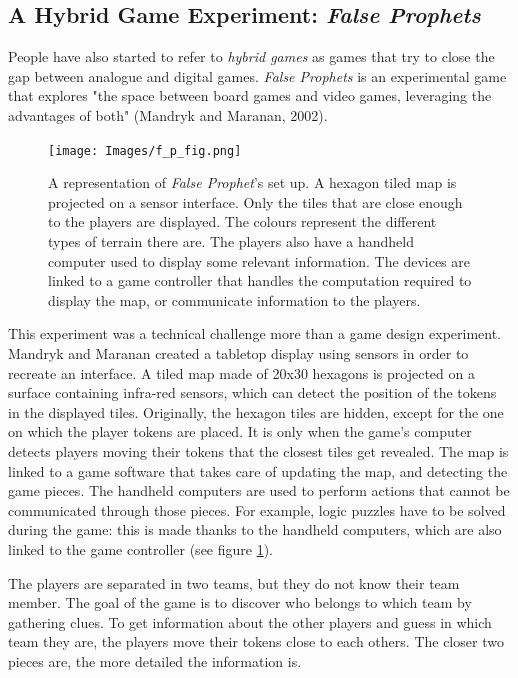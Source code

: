 \subsection{A Hybrid Game Experiment: \textit{False Prophets}}
People have also started to refer to \textit{hybrid games} as games that try to close the gap between analogue and digital games. \textit{False Prophets} is an experimental game that explores "the space between board games and video games, leveraging the advantages of both" (Mandryk and Maranan, 2002)\cite{art:prophets}. 

\begin{figure}[!ht]
    \centering
    \texttt{[image: Images/f\_p\_fig.png]}
    \caption{A representation of \textit{False Prophet}'s set up. A hexagon tiled map is projected on a sensor interface. Only the tiles that are close enough to the players are displayed. The colours represent the different types of terrain there are. The players also have a handheld computer used to display some relevant information. The devices are linked to a game controller that handles the computation required to display the map, or communicate information to the players.}
    \label{fig:falseprophet}
\end{figure}

This experiment was a technical challenge more than a game design experiment. Mandryk and Maranan created a tabletop display using sensors in order to recreate an interface. A tiled map made of 20x30 hexagons is projected on a surface containing infra-red sensors, which can detect the position of the tokens in the displayed tiles. Originally, the hexagon tiles are hidden, except for the one on which the player tokens are placed. It is only when the game's computer detects players moving their tokens that the closest tiles get revealed. The map is linked to a game software that takes care of updating the map, and detecting the game pieces. The handheld computers are used to perform actions that cannot be communicated through those pieces. For example, logic puzzles have to be solved during the game: this is made thanks to the handheld computers, which are also linked to the game controller (see figure \ref{fig:falseprophet}). 

The players are separated in two teams, but they do not know their team member. The goal of the game is to discover who belongs to which team by gathering clues. To get information about the other players and guess in which team they are, the players move their tokens close to each others. The closer two pieces are, the more detailed the information is. 

